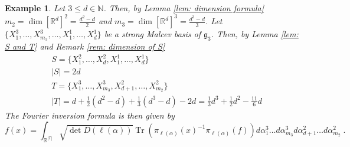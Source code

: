 \documentclass[pdflatex,sn-mathphys-num]{sn-jnl}
\theoremstyle{thmstyletwo}
\theoremstyle{thmstyleone}
\theoremstyle{thmstyletwo}
\newtheorem{example}[definition]{Example}
\newcommand{\fancyg}{\mathfrak{g}}
\begin{document}
		\begin{example}
			Let $3\leq d \in \mathbb{N}$. Then, by Lemma \ref{lem: dimension formula} $m_2 = \dim[\mathbb{R}^d]^2 = \frac{d^2-d}{2}$ and $m_3 = \dim[\mathbb{R}^d]^3 = \frac{d^3-d}{3}$. Let $\{X_1^3, \ldots,X_{m_3}^3, \ldots, X_1^1, \ldots,X_d^1\}$ be a strong Malcev basis of $\fancyg_{3}$. Then, by Lemma \ref{lem: S and T} and Remark \ref{rem: dimension of S}
			\begin{align*}
				&S = \{X_1^2, \ldots, X_d^2,X_1^1, \ldots, X_d^1\}\\
				&|S| = 2d\\
				&T = \{X_1^3, \ldots, X_{m_3}^3,X_{d+1}^2, \ldots, X_{m_2}^2\}\\
				&|T| = d+\frac{1}{2}(d^2-d)+\frac{1}{3}(d^3-d)-2d =\frac{1}{3}d^3+ \frac{1}{2}d^2-\frac{11}{6}d
			\end{align*}
			The Fourier inversion formula is then given by
			\[f(x) = \int_{\mathbb{R}^{|T|}}\sqrt{\operatorname{det}D(\ell(\alpha))}\operatorname{Tr}\left( \pi_{\ell(\alpha)}(x)^{-1}\pi_{\ell(\alpha)}(f)\right)d\alpha_1^3\ldots d\alpha_{m_3}^3 d\alpha_{d+1}^2\ldots d\alpha_{m_2}^2 \;.\]
		\end{example}
		
\end{document}
